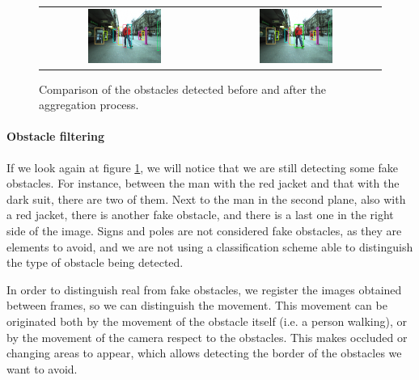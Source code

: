 \begin{figure}[h!]
\centering
\begin{tabular}{cc}
\includegraphics[width=0.45\textwidth]{obstaclesBeforeAggregation}\label{fig:cp04_before_aggregation} &
\includegraphics[width=0.45\textwidth]{obstaclesAggregated}\label{fig:cp04_after_aggregation}
\end{tabular}
\caption{Comparison of the obstacles detected before and after the aggregation process.}\label{fig:cp04_clustering_aggregation}
\end{figure}

\paragraph{Obstacle filtering}\label{ch:chapter04_01_04_01_02}

If we look again at figure \ref{fig:cp04_clustering_aggregation}, we will notice that we are still detecting some fake obstacles. For instance, between the man with the red jacket and that with the dark suit, there are two of them. Next to the man in the second plane, also with a red jacket, there is another fake obstacle, and there is a last one in the right side of the image. Signs and poles are not considered fake obstacles, as they are elements to avoid, and we are not using a classification scheme able to distinguish the type of obstacle being detected.

In order to distinguish real from fake obstacles, we register the images obtained between frames, so we can distinguish the movement. This movement can be originated both by the movement of the obstacle itself (i.e. a person walking), or by the movement of the camera respect to the obstacles. This makes occluded or changing areas to appear, which allows detecting the border of the obstacles we want to avoid.

